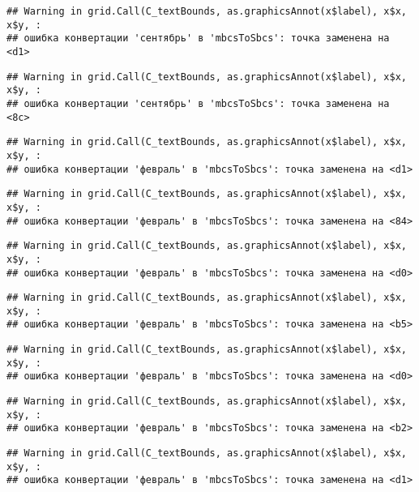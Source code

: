 \documentclass[
]{article}
\begin{document}
\begin{verbatim}
## Warning in grid.Call(C_textBounds, as.graphicsAnnot(x$label), x$x, x$y, :
## ошибка конвертации 'сентябрь' в 'mbcsToSbcs': точка заменена на <d1>
\end{verbatim}

\begin{verbatim}
## Warning in grid.Call(C_textBounds, as.graphicsAnnot(x$label), x$x, x$y, :
## ошибка конвертации 'сентябрь' в 'mbcsToSbcs': точка заменена на <8c>
\end{verbatim}

\begin{verbatim}
## Warning in grid.Call(C_textBounds, as.graphicsAnnot(x$label), x$x, x$y, :
## ошибка конвертации 'февраль' в 'mbcsToSbcs': точка заменена на <d1>
\end{verbatim}

\begin{verbatim}
## Warning in grid.Call(C_textBounds, as.graphicsAnnot(x$label), x$x, x$y, :
## ошибка конвертации 'февраль' в 'mbcsToSbcs': точка заменена на <84>
\end{verbatim}

\begin{verbatim}
## Warning in grid.Call(C_textBounds, as.graphicsAnnot(x$label), x$x, x$y, :
## ошибка конвертации 'февраль' в 'mbcsToSbcs': точка заменена на <d0>
\end{verbatim}

\begin{verbatim}
## Warning in grid.Call(C_textBounds, as.graphicsAnnot(x$label), x$x, x$y, :
## ошибка конвертации 'февраль' в 'mbcsToSbcs': точка заменена на <b5>
\end{verbatim}

\begin{verbatim}
## Warning in grid.Call(C_textBounds, as.graphicsAnnot(x$label), x$x, x$y, :
## ошибка конвертации 'февраль' в 'mbcsToSbcs': точка заменена на <d0>
\end{verbatim}

\begin{verbatim}
## Warning in grid.Call(C_textBounds, as.graphicsAnnot(x$label), x$x, x$y, :
## ошибка конвертации 'февраль' в 'mbcsToSbcs': точка заменена на <b2>
\end{verbatim}

\begin{verbatim}
## Warning in grid.Call(C_textBounds, as.graphicsAnnot(x$label), x$x, x$y, :
## ошибка конвертации 'февраль' в 'mbcsToSbcs': точка заменена на <d1>
\end{verbatim}
\end{document}
